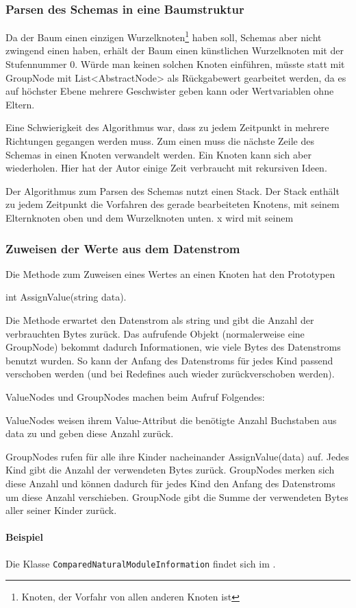 \subsubsection{Parsen des Schemas in eine Baumstruktur}
Da der Baum einen einzigen Wurzelknoten\footnote{Knoten, der Vorfahr von allen anderen Knoten ist} haben soll, Schemas aber nicht zwingend einen haben, erhält der Baum einen künstlichen Wurzelknoten mit der Stufennummer 0. Würde man keinen solchen Knoten einführen, müsste statt mit GroupNode mit List<AbstractNode> als Rückgabewert gearbeitet werden, da es auf höchster Ebene mehrere Geschwister geben kann oder Wertvariablen ohne Eltern.

Eine Schwierigkeit des Algorithmus war, dass zu jedem Zeitpunkt in mehrere Richtungen gegangen werden muss. Zum einen muss die nächste Zeile des Schemas in einen Knoten verwandelt werden. Ein Knoten kann sich aber wiederholen.
Hier hat der Autor einige Zeit verbraucht mit rekursiven Ideen.

Der Algorithmus zum Parsen des Schemas nutzt einen Stack. Der Stack enthält zu jedem Zeitpunkt die Vorfahren des gerade bearbeiteten Knotens, mit seinem Elternknoten oben und dem Wurzelknoten unten. x wird mit seinem





\subsubsection{Zuweisen der Werte aus dem Datenstrom}
Die Methode zum Zuweisen eines Wertes an einen Knoten hat den Prototypen 

int AssignValue(string data).

Die Methode erwartet den Datenstrom als string und gibt die Anzahl der verbrauchten Bytes zurück. Das aufrufende Objekt (normalerweise eine GroupNode) bekommt dadurch Informationen, wie viele Bytes des Datenstroms benutzt wurden. So kann der Anfang des Datenstroms für jedes Kind passend verschoben werden (und bei Redefines auch wieder zurückverschoben werden).

ValueNodes und GroupNodes machen beim Aufruf Folgendes:

ValueNodes weisen ihrem Value-Attribut die benötigte Anzahl Buchstaben aus data zu und geben diese Anzahl zurück.


GroupNodes rufen für alle ihre Kinder nacheinander AssignValue(data) auf. Jedes Kind gibt die Anzahl der verwendeten Bytes zurück. GroupNodes merken sich diese Anzahl und können dadurch für jedes Kind den Anfang des Datenstroms um diese Anzahl verschieben. GroupNode gibt die Summe der verwendeten Bytes aller seiner Kinder zurück.

\paragraph{Beispiel}
Die Klasse \texttt{Com\-par\-ed\-Na\-tu\-ral\-Mo\-dule\-In\-for\-ma\-tion} findet sich im .  






